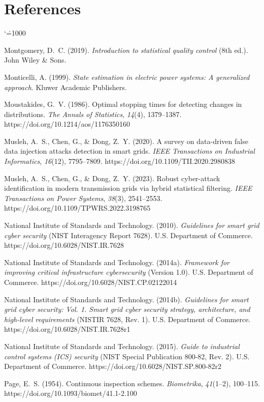 \documentclass[11pt,a4paper]{report}
\makeatletter
\renewcommand{\bibname}{References}
\renewenvironment{thebibliography}[1]{%
  \chapter*{\bibname}%
  \addcontentsline{toc}{chapter}{\bibname}%
  \list{}{%
    \setlength{\labelwidth}{0pt}%
    \setlength{\labelsep}{0pt}%
    \setlength{\leftmargin}{0.35in}%
    \setlength{\itemindent}{-0.35in}%
    \setlength{\itemsep}{6pt}%
    \setlength{\parsep}{0pt}%
    \usecounter{enumiv}%
    \let\p@enumiv\@empty
    \renewcommand\theenumiv{\@arabic\c@enumiv}%
  }%
  \sloppy\clubpenalty4000\widowpenalty4000%
  \sfcode`\.=1000\relax
}{%
  \endlist
}
\makeatother
\begin{document}
\begin{thebibliography}{99}
Montgomery, D.~C. (2019). \textit{Introduction to statistical quality control} (8th ed.). John Wiley \& Sons.

Monticelli, A. (1999). \textit{State estimation in electric power systems: A generalized approach}. Kluwer Academic Publishers.

Moustakides, G.~V. (1986). Optimal stopping times for detecting changes in distributions. \textit{The Annals of Statistics}, \textit{14}(4), 1379--1387. https://doi.org/10.1214/aos/1176350160

Musleh, A.~S., Chen, G., \& Dong, Z.~Y. (2020). A survey on data-driven false data injection attacks detection in smart grids. \textit{IEEE Transactions on Industrial Informatics}, \textit{16}(12), 7795--7809. https://doi.org/10.1109/TII.2020.2980838

Musleh, A.~S., Chen, G., \& Dong, Z.~Y. (2023). Robust cyber-attack identification in modern transmission grids via hybrid statistical filtering. \textit{IEEE Transactions on Power Systems}, \textit{38}(3), 2541--2553. https://doi.org/10.1109/TPWRS.2022.3198765

National Institute of Standards and Technology. (2010). \textit{Guidelines for smart grid cyber security} (NIST Interagency Report 7628). U.S. Department of Commerce. https://doi.org/10.6028/NIST.IR.7628

National Institute of Standards and Technology. (2014a). \textit{Framework for improving critical infrastructure cybersecurity} (Version 1.0). U.S. Department of Commerce. https://doi.org/10.6028/NIST.CP.02122014

National Institute of Standards and Technology. (2014b). \textit{Guidelines for smart grid cyber security: Vol. 1. Smart grid cyber security strategy, architecture, and high-level requirements} (NISTIR 7628, Rev. 1). U.S. Department of Commerce. https://doi.org/10.6028/NIST.IR.7628r1

National Institute of Standards and Technology. (2015). \textit{Guide to industrial control systems (ICS) security} (NIST Special Publication 800-82, Rev. 2). U.S. Department of Commerce. https://doi.org/10.6028/NIST.SP.800-82r2

Page, E.~S. (1954). Continuous inspection schemes. \textit{Biometrika}, \textit{41}(1--2), 100--115. https://doi.org/10.1093/biomet/41.1-2.100


\end{thebibliography}
\end{document}
